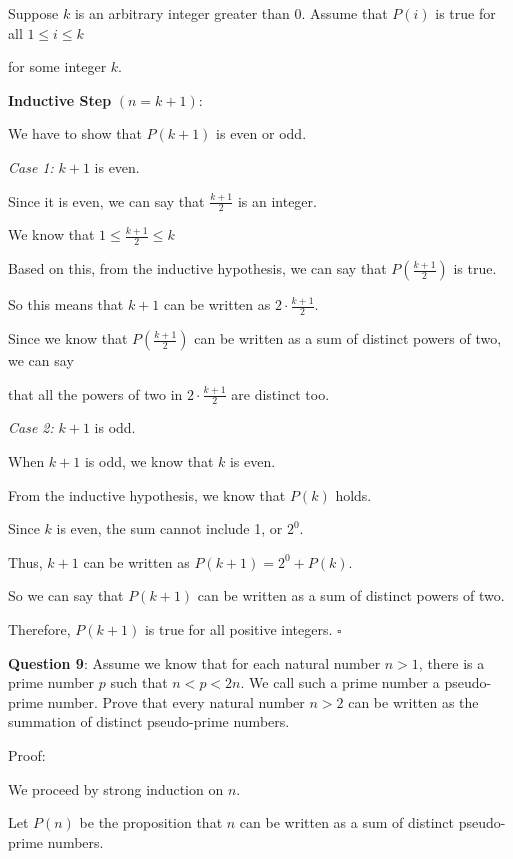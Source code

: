 \documentclass{article} %
\newcommand{\question}[2][]{\begin{flushleft}
        \textbf{Question #1}: #2

\end{flushleft}}
\begin{document}
    Suppose $k$ is an arbitrary integer greater than 0. Assume that $P(i)$ is true for all $1 \leq i \leq k$ 
    
    for some integer $k$.

    \textbf{Inductive Step} $(n = k + 1)$:

    We have to show that $P(k + 1)$ is even or odd.

    \textit{Case 1:} $k + 1$ is even.

    \tabto{1cm} Since it is even, we can say that $\frac{k + 1}{2}$ is an integer. 

    \tabto{1cm} We know that $1 \leq \frac{k + 1}{2} \leq k$ 

    \tabto{1cm} Based on this, from the inductive hypothesis, we can say that $P(\frac{k + 1}{2})$ is true.

    \tabto{1cm} So this means that $k + 1$ can be written as $2 \cdot \frac{k + 1}{2}$.

    \tabto{1cm} Since we know that $P(\frac{k + 1}{2})$ can be written as a sum of distinct powers of two, we can say 
    
    \tabto{1cm} that all the powers of two in $2 \cdot \frac{k + 1}{2}$ are distinct too.

    \textit{Case 2:} $k + 1$ is odd.
    
    \tabto{1cm} When $k + 1$ is odd, we know that $k$ is even.

    \tabto{1cm} From the inductive hypothesis, we know that $P(k)$ holds.

    \tabto{1cm} Since $k$ is even, the sum cannot include 1, or $2^0$.

    \tabto{1cm} Thus, $k + 1$ can be written as $P(k + 1) = 2^0 + P(k)$.

    \tabto{1cm} So we can say that $P(k + 1)$ can be written as a sum of distinct powers of two.

    Therefore, $P(k + 1)$ is true for all positive integers. $\square$

    \newpage

    \question[9]{Assume we know that for each natural number $n > 1$, there is a prime number $p$ 
    such that $n < p < 2n$. We call such a prime number a pseudo-prime number. Prove that every 
    natural number $n > 2$ can be written as the summation of distinct pseudo-prime numbers.}

    Proof:

    We proceed by strong induction on $n$.

    Let $P(n)$ be the proposition that $n$ can be written as a sum of distinct pseudo-prime numbers.
\end{document}
